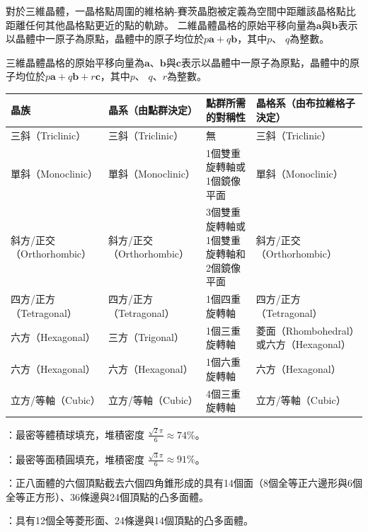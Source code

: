 \documentclass[a4paper,12pt]{report}
\begin{document}
對於三維晶體，一晶格點周圍的維格納-賽茨晶胞被定義為空間中距離該晶格點比距離任何其他晶格點更近的點的軌跡。
二維晶體晶格的原始平移向量為$\mathbf {a}$與$\mathbf{b}$表示以晶體中一原子為原點，晶體中的原子均位於$p\mathbf {a} +q\mathbf {b} $，其中$p$、 $q$為整數。

三維晶體晶格的原始平移向量為$\mathbf {a}$、$\mathbf{b}$與$\mathbf {c}$表示以晶體中一原子為原點，晶體中的原子均位於$p\mathbf {a} +q\mathbf {b} +r\mathbf {c} $，其中$p$、 $q$、$r$為整數。
\begin{longtable}[c]{|p{0.2\tw}|p{0.2\tw}|p{0.2\tw}|p{0.2\tw}|}
    \hline
        晶族 & 晶系（由點群決定） & 點群所需的對稱性 & 晶格系（由布拉維格子決定） \\ \hline\endhead
        三斜（Triclinic） & 三斜（Triclinic） & 無 & 三斜（Triclinic） \\ \hline
        單斜（Monoclinic） & 單斜（Monoclinic） & 1個雙重旋轉軸或1個鏡像平面 & 單斜（Monoclinic） \\ \hline
        斜方/正交（Orthorhombic） & 斜方/正交（Orthorhombic） & 3個雙重旋轉軸或1個雙重旋轉軸和2個鏡像平面 & 斜方/正交（Orthorhombic） \\ \hline
        四方/正方（Tetragonal） & 四方/正方（Tetragonal） & 1個四重旋轉軸 & 四方/正方（Tetragonal） \\ \hline
        六方（Hexagonal） & 三方（Trigonal） & 1個三重旋轉軸 & 菱面（Rhombohedral）或六方（Hexagonal） \\ \hline
        六方（Hexagonal） & 六方（Hexagonal） & 1個六重旋轉軸 & 六方（Hexagonal） \\ \hline
        立方/等軸（Cubic） & 立方/等軸（Cubic） & 4個三重旋轉軸 & 立方/等軸（Cubic） \\ \hline
    \end{longtable}\FB
{}
\bit
\item {}：最密等體積球填充，堆積密度 $\frac{\sqrt{2}\pi}{6}\approx 74\%$。
\item {}：最密等面積圓填充，堆積密度 $\frac{\sqrt{3}\pi}{6}\approx 91\%$。
\item {}：正八面體的六個頂點截去六個四角錐形成的具有14個面（8個全等正六邊形與6個全等正方形）、36條邊與24個頂點的凸多面體。
\item {}：具有12個全等菱形面、24條邊與14個頂點的凸多面體。
\end{document}
